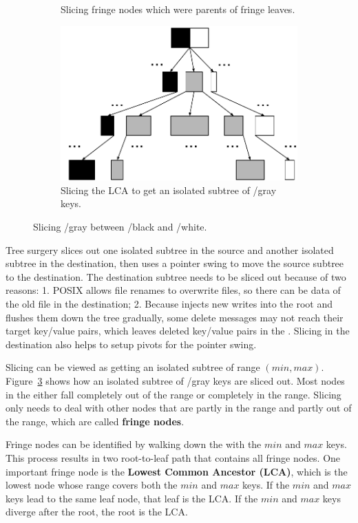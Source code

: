 \begin{figure}
\begin{subfigure}{.45\textwidth}
    \caption{Slicing fringe nodes which were parents of fringe leaves.}
    \label{subfig:slice-3}
  \end{subfigure}
  \begin{subfigure}{.45\textwidth}
    \centering
    \includegraphics[width=.9\linewidth]{fig/slice-4}
    \caption{Slicing the LCA to get an isolated subtree of /gray keys.}
    \label{subfig:slice-4}
  \end{subfigure}
  \caption{Slicing /gray between /black and /white.}
  \label{fig:slice}
\end{figure}

Tree surgery slices out one isolated subtree in the source and another isolated
subtree in the destination, then uses a pointer swing to move the source
subtree to the destination.
The destination subtree needs to be sliced out because of two
reasons: 1. POSIX allows file renames to overwrite files, so there can be data
of the old file in the destination; 2. Because \bet injects new writes into the
root and flushes them down the tree gradually, some delete messages may not
reach their target key/value pairs,
which leaves deleted key/value pairs in the \bet.
Slicing in the destination also helps to setup pivots for the pointer swing.

Slicing can be viewed as getting an isolated subtree of range $(min, max)$.
Figure~\ref{fig:slice} shows how an isolated subtree of /gray keys are sliced
out.
Most nodes in the \bet either fall completely out of the range or completely
in the range.
Slicing only needs to deal with other nodes that are partly in the range and
partly out of the range, which are called {\bf fringe nodes}.

Fringe nodes can be identified by walking down the \bet with the $min$ and
$max$ keys.
This process results in two root-to-leaf path that contains all fringe nodes.
One important fringe node is the {\bf Lowest Common Ancestor (LCA)}, which is
the lowest node whose range covers both the $min$ and $max$ keys.
If the $min$ and $max$ keys lead to the same leaf node, that leaf is the LCA.
If the $min$ and $max$ keys diverge after the root, the root is the LCA.

